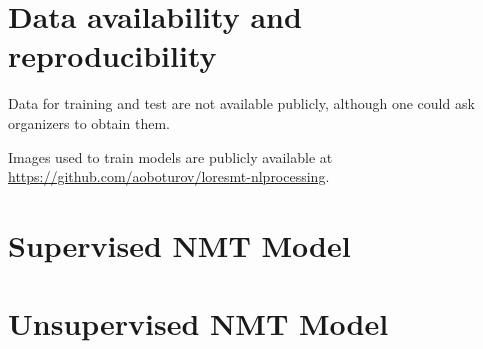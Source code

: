 \documentclass[]{article}
\begin{document}
\section{Data availability and reproducibility}
Data for training and test are not available publicly, although one could ask organizers to obtain them.

Images used to train models are publicly available at \url{https://github.com/aoboturov/loresmt-nlprocessing}.

\small




\begin{appendices}
\section{Supervised NMT Model}
\label{appendix:supervised}


\section{Unsupervised NMT Model}
\label{appendix:unsupervised}

\end{appendices}
\end{document}
